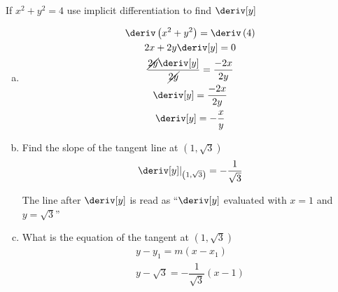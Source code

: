 \begin{example}
    If $x^2 + y^2 = 4$ use implicit differentiation to find $\deriv[y]$
    \begin{enumerate}[a)]
        \item \begin{gather*}
            \deriv \left(x^2 + y^2\right) = \deriv \left(4\right) \\
            2x + 2y\deriv[y] = 0 \\
            \dfrac{\cancel{2y}\deriv[y]}{\cancel{2y}} = \dfrac{-2x}{2y} \\
            \deriv[y] = \dfrac{-2x}{2y} \\
            \deriv[y] = -\dfrac{x}{y}
        \end{gather*}
        \item Find the slope of the tangent line at $\left(1, \sqrt{3}\right)$ \\
        \begin{equation*}
            \Eval{\deriv[y]}{\left(1, \sqrt{3}\right)} = - \dfrac{1}{\sqrt{3}}
        \end{equation*}
        \begin{note}
            The line after $\deriv[y]$ is read as ``$\deriv[y]$ evaluated with $ x= 1$ and $y = \sqrt{3}$''
        \end{note}
        \item What is the equation of the tangent at $\left(1, \sqrt{3}\right)$
        \begin{gather*}
            y - y_1 = m\left(x - x_1\right) \\
            y - \sqrt{3} = - \dfrac{1}{\sqrt{3}}\left(x - 1\right)
        \end{gather*}
    \end{enumerate}
\end{example}
